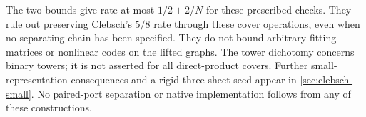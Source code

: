 The two bounds give rate at most $1/2+2/N$ for these prescribed checks.
They rule out preserving Clebsch's $5/8$ rate through these cover
operations, even when no separating chain has been specified. They do
not bound arbitrary fitting matrices or nonlinear codes on the lifted
graphs. The tower dichotomy concerns binary towers; it is not asserted
for all direct-product covers. Further small-representation consequences
and a rigid three-sheet seed appear in \cref{sec:clebsch-small}.
No paired-port separation or native implementation follows from any
of these constructions.
